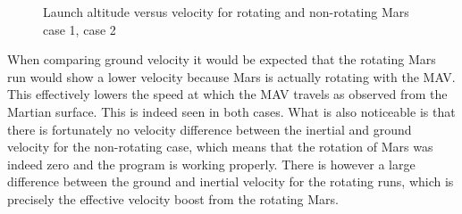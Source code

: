\begin{figure}[H]
\centering
{} 
\caption{Launch altitude versus velocity for rotating and non-rotating Mars \protect{} case 1,  \protect{} case 2 } 
\label{fig:launchAltitudeVsVelocityCase1combined} 
\end{figure} 

\noindent
When comparing ground velocity it would be expected that the rotating Mars run would show a lower velocity because Mars is actually rotating with the \ac{MAV}. This effectively lowers the speed at which the \ac{MAV} travels as observed from the Martian surface. This is indeed seen in both cases. What is also noticeable is that there is fortunately no velocity difference between the inertial and ground velocity for the non-rotating case, which means that the rotation of Mars was indeed zero and the program is working properly. There is however a large difference between the ground and inertial velocity for the rotating runs, which is precisely the effective velocity boost from the rotating Mars.\\

